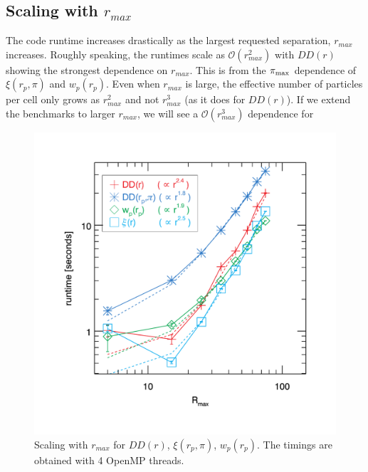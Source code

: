 \documentclass[12pt,titlepage]{article}
\newcommand{\rmax}{\ensuremath{{r_{max}}}\xspace}
\newcommand{\xir}{\ensuremath{{DD(r)}}\xspace}
\newcommand{\wprp}{\ensuremath{{w_p(r_p)}}\xspace}
\newcommand{\xirppi}{\ensuremath{{\xi(r_p,\pi)}}\xspace}
\newcommand{\pimax}{\ensuremath{{\pi_{\rm max}}}\xspace}
\begin{document}
\subsection{Scaling with \texorpdfstring{\rmax}{rmax}}
The code runtime increases drastically as the largest requested separation, \rmax increases. Roughly speaking, the runtimes scale 
as $\mathcal{O}(r_{max}^2)$ with \xir showing the strongest dependence on \rmax. This is from the \pimax dependence of \xirppi and 
\wprp. Even when \rmax is large, the effective number of particles per cell only grows as $r_{max}^2$ and not $r_{max}^3$ (as it does 
for \xir). If we extend the benchmarks to larger \rmax, we will see a $\mathcal{O}(r_{max}^3)$ dependence for 
\begin{figure}[htbp]
\includegraphics[clip=true,width=\linewidth]{timings_Mr19_rmax}%
\caption{Scaling with \rmax for \xir, \xirppi, \wprp. The timings are obtained 
with 4 OpenMP threads. }
\label{fig:scaling_rmax}
\end{figure}
\end{document}
